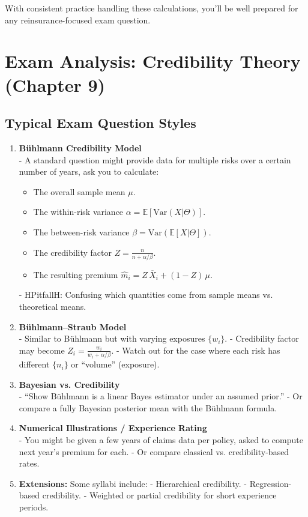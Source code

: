 \documentclass[13pt,a4paper]{article}
\begin{document}
\noindent
With consistent practice handling these calculations, you’ll be well prepared for any reinsurance-focused exam question.

\section{Exam Analysis: Credibility Theory (Chapter 9)}
\label{sec:credibility_exam_analysis}

\subsection{Typical Exam Question Styles}
\begin{enumerate}
  \item \textbf{B\"{u}hlmann Credibility Model}\\
    - A standard question might provide data for multiple risks over a certain number of years, ask you to calculate:
      \begin{itemize}
        \item The overall sample mean \(\mu\).
        \item The within-risk variance \(\alpha=\mathbb{E}[\mathrm{Var}(X|\Theta)]\).
        \item The between-risk variance \(\beta=\mathrm{Var}(\mathbb{E}[X|\Theta])\).
        \item The credibility factor \(Z=\frac{n}{n + \alpha/\beta}\).
        \item The resulting premium \(\hat{m}_i = Z\,\overline{X}_i + (1-Z)\,\mu\).
      \end{itemize}
    - HPitfallH: Confusing which quantities come from sample means vs. theoretical means.

  \item \textbf{B\"{u}hlmann--Straub Model}\\
    - Similar to B\"{u}hlmann but with varying exposures \(\{w_i\}\).  
    - Credibility factor may become \(Z_i = \frac{w_i}{w_i + \alpha/\beta}\).  
    - Watch out for the case where each risk has different \(\{n_i\}\) or “volume” (exposure).

  \item \textbf{Bayesian vs. Credibility}\\
    - “Show B\"{u}hlmann is a linear Bayes estimator under an assumed prior.”  
    - Or compare a fully Bayesian posterior mean with the B\"{u}hlmann formula.  

  \item \textbf{Numerical Illustrations / Experience Rating}\\
    - You might be given a few years of claims data per policy, asked to compute next year’s premium for each.  
    - Or compare classical vs. credibility-based rates.  

  \item \textbf{Extensions:} Some syllabi include:
    - Hierarchical credibility.  
    - Regression-based credibility.  
    - Weighted or partial credibility for short experience periods.
\end{enumerate}
\end{document}
